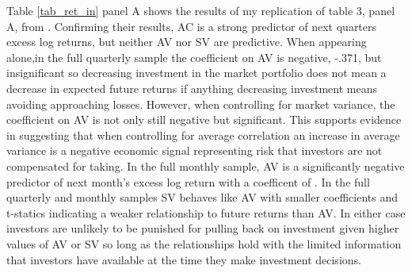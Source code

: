 Table \ref{tab_ret_in} panel A shows the results of my replication of table 3, panel A, from \cite{pollet_average_2010}. Confirming their results, AC is a strong predictor of next quarters excess log returns, but neither AV nor SV are predictive. When appearing alone,in the full quarterly sample the coefficient on AV is negative, -.371, but insignificant so decreasing investment in the market portfolio does not mean a decrease in expected future returns if anything decreasing investment means avoiding approaching losses. However, when controlling for market variance, the coefficient on AV is not only still negative but significant. This supports evidence in \citet{pollet_average_2010} suggesting that when controlling for average correlation an increase in average variance is a negative economic signal representing risk that investors are not compensated for taking. In the full monthly sample, AV is a significantly negative predictor of next month's excess log return with a coefficent of . In the full quarterly and monthly samples SV behaves like AV with smaller coefficients and t-statics indicating a weaker relationship to future returns than AV. In either case investors are unlikely to be punished for pulling back on investment given higher values of AV or SV so long as the relationships hold with the limited information that investors have available at the time they make investment decisions.